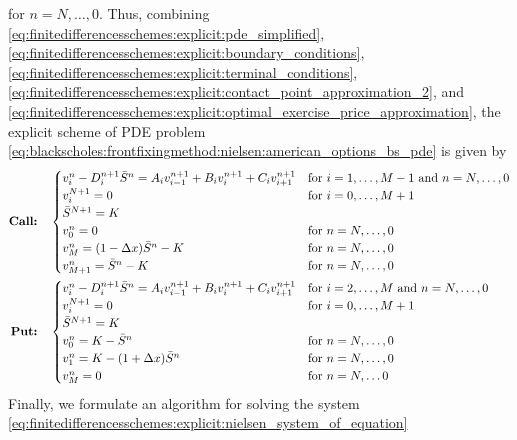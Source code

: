for $n = N,\dots,0$. Thus, combining \eqref{eq:finitedifferencesschemes:explicit:pde_simplified}, \eqref{eq:finitedifferencesschemes:explicit:boundary_conditions}, 
\eqref{eq:finitedifferencesschemes:explicit:terminal_conditions},
\eqref{eq:finitedifferencesschemes:explicit:contact_point_approximation_2}, and \eqref{eq:finitedifferencesschemes:explicit:optimal_exercise_price_approximation}, the explicit scheme of PDE problem \eqref{eq:blackscholes:frontfixingmethod:nielsen:american_options_bs_pde} is given by
{
\allowdisplaybreaks
\begin{subequations}
\label{eq:finitedifferencesschemes:explicit:nielsen_system_of_equation}
\begin{align}
  \text{\textbf{Call:}} \quad& \begin{cases}
    v^{n}_{i} - D^{n+1}_{i}\bar{S}^n = A_i v^{n+1}_{i-1} + B_{i}v^{n+1}_{i} + C_{i}v^{n+1}_{i+1} & \text{for $i = 1, \dots, M-1$ and $n = N,\dots, 0$}\\
    v^{N+1}_i = 0 & \text{for $i = 0, \dots, M+1$}  \\
    \bar{S}^{N+1} = K \\
    v^{n}_0 = 0 & \text{for $n = N, \dots, 0$} \\ 
    v^{n}_{M} = (1-\Delta{x})\bar{S}^n - K & \text{for $n = N, \dots, 0$} \\
    v^{n}_{M+1} = \bar{S}^n - K  & \text{for $n = N, \dots, 0$}
  \end{cases}\\
  \text{\textbf{Put:}} \quad&  \begin{cases}
    v^{n}_{i} - D^{n+1}_{i}\bar{S}^n = A_i v^{n+1}_{i-1} + B_{i}v^{n+1}_{i} + C_{i}v^{n+1}_{i+1} & \text{for $i = 2, \dots, M$ and $n = N,\dots,0$} \\
    v^{N+1}_i = 0 & \text{for $i = 0, \dots, M+1$} \\ 
    \bar{S}^{N+1} = K \\
    v^{n}_{0} = K - \bar{S}^{n} & \text{for $n = N, \dots, 0$} \\
    v^{n}_{1} =  K - (1+\Delta{x})\bar{S}^{n}  & \text{for $n = N, \dots, 0$} \\
    v^{n}_{M} = 0 & \text{for $n = N, \dots 0$}
  \end{cases}
\end{align}
\end{subequations}
}
Finally, we formulate an algorithm for solving the system \eqref{eq:finitedifferencesschemes:explicit:nielsen_system_of_equation}

